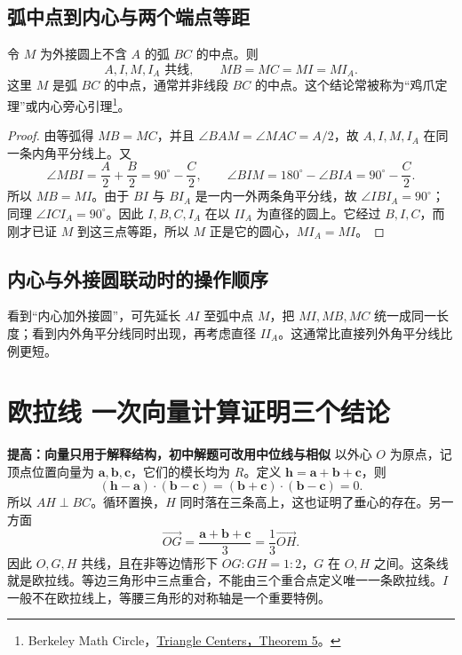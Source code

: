 \documentclass[lang=cn,12pt,fontset=none,a4paper,openany]{beautybook}
\newcommand{\level}[1]{\par\smallskip\noindent\textcolor{coverfgcolor}{\textbf{#1}}\quad}
\begin{document}
\subsection{弧中点到内心与两个端点等距}
令 $M$ 为外接圆上不含 $A$ 的弧 $BC$ 的中点。则
\[
 A,I,M,I_A\text{ 共线},\qquad MB=MC=MI=MI_A.
\]
这里 $M$ 是弧 $BC$ 的中点，通常并非线段 $BC$ 的中点。这个结论常被称为“鸡爪定理”或内心旁心引理\footnote{Berkeley Math Circle，\href{https://mathcircle.berkeley.edu/sites/default/files/archivedocs/2014_2015/lectures/1415lecturespdf/Int\%20II\%20-\%202015.01.20.pdf}{Triangle Centers，Theorem 5}。}。
\begin{proof}
由等弧得 $MB=MC$，并且 $\angle BAM=\angle MAC=A/2$，故 $A,I,M,I_A$ 在同一条内角平分线上。又
\[
 \angle MBI=\frac A2+\frac B2=90^\circ-\frac C2,
 \qquad
 \angle BIM=180^\circ-\angle BIA=90^\circ-\frac C2.
\]
所以 $MB=MI$。由于 $BI$ 与 $BI_A$ 是一内一外两条角平分线，故 $\angle IBI_A=90^\circ$；同理 $\angle ICI_A=90^\circ$。因此 $I,B,C,I_A$ 在以 $II_A$ 为直径的圆上。它经过 $B,I,C$，而刚才已证 $M$ 到这三点等距，所以 $M$ 正是它的圆心，$MI_A=MI$。
\end{proof}

\begin{center}
\end{center}


\subsection{内心与外接圆联动时的操作顺序}
看到“内心加外接圆”，可先延长 $AI$ 至弧中点 $M$，把 $MI,MB,MC$ 统一成同一长度；看到内外角平分线同时出现，再考虑直径 $II_A$。这通常比直接列外角平分线比例更短。

\section{欧拉线 一次向量计算证明三个结论}
\level{提高：向量只用于解释结构，初中解题可改用中位线与相似}
以外心 $O$ 为原点，记顶点位置向量为 $\mathbf a,\mathbf b,\mathbf c$，它们的模长均为 $R$。定义 $\mathbf h=\mathbf a+\mathbf b+\mathbf c$，则
\[
 (\mathbf h-\mathbf a)\cdot(\mathbf b-\mathbf c)
 =(\mathbf b+\mathbf c)\cdot(\mathbf b-\mathbf c)=0.
\]
所以 $AH\perp BC$。循环置换，$H$ 同时落在三条高上，这也证明了垂心的存在。另一方面
\[
 \overrightarrow{OG}=\frac{\mathbf a+\mathbf b+\mathbf c}{3}
 =\frac13\overrightarrow{OH}.
\]
因此 $O,G,H$ 共线，且在非等边情形下 $OG:GH=1:2$，$G$ 在 $O,H$ 之间。这条线就是欧拉线。等边三角形中三点重合，不能由三个重合点定义唯一一条欧拉线。$I$ 一般不在欧拉线上，等腰三角形的对称轴是一个重要特例。
\end{document}
